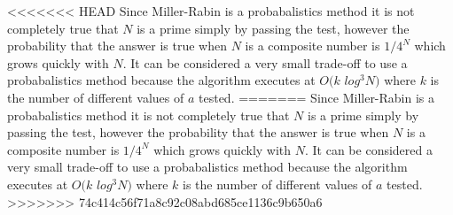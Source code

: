 <<<<<<< HEAD
Since Miller-Rabin is a probabalistics method it is not completely true that $N$ is a prime simply by passing the test, however the probability that the answer is true when $N$ is a composite number is $1 / 4^{N}$ which grows quickly with $N$. It can be considered a very small trade-off to use a probabalistics method because the algorithm executes at $O(k$ $log^3 N)$ where $k$ is the number of different values of $a$ tested. \cite{miller}
=======
Since Miller-Rabin is a probabalistics method it is not completely true that $N$ is a prime simply by passing the test, however the probability that the answer is true when $N$ is a composite number is $1 / 4^{N}$ which grows quickly with $N$. It can be considered a very small trade-off to use a probabalistics method because the algorithm executes at $O(k$ $log^3 N)$ where $k$ is the number of different values of $a$ tested. \cite{miller}
>>>>>>> 74c414c56f71a8c92c08abd685ce1136c9b650a6
